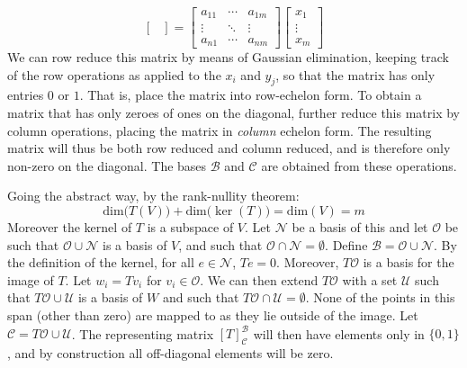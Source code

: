 \documentclass[crop=false,class=article]{standalone}                           %
\begin{document}
\begin{solution}
\begin{equation}
\begin{bmatrix}
                \end{bmatrix}=
                \begin{bmatrix}
                    a_{11}&\cdots&a_{1m}\\
                    \vdots&\ddots&\vdots\\
                    a_{n1}&\cdots&a_{nm}
                \end{bmatrix}
                \begin{bmatrix}
                    x_{1}\\
                    \vdots\\
                    x_{m}
                \end{bmatrix}
            \end{equation}
            We can row reduce this matrix by means of Gaussian elimination,
            keeping track of the row operations as applied to the $x_{i}$
            and $y_{j}$, so that the matrix has only entries $0$ or $1$.
            That is, place the matrix into row-echelon form. To obtain a
            matrix that has only zeroes of ones on the diagonal, further
            reduce this matrix by column operations, placing the matrix
            in \textit{column} echelon form. The resulting matrix will thus
            be both row reduced and column reduced, and is therefore only
            non-zero on the diagonal. The bases $\mathscr{B}$ and
            $\mathscr{C}$ are obtained from these operations.
            \par\hfill\par
            Going the abstract way, by the rank-nullity theorem:
            \begin{equation}
                \textrm{dim}\big(T(V)\big)+
                \textrm{dim}\big(\ker(T)\big)=
                \textrm{dim}(V)=m
            \end{equation}
            Moreover the kernel of $T$ is a subspace of $V$. Let
            $\mathcal{N}$ be a basis of this and let $\mathcal{O}$ be such
            that $\mathcal{O}\cup\mathcal{N}$ is a basis of $V$, and such
            that $\mathcal{O}\cap\mathcal{N}=\emptyset$.
            Define $\mathscr{B}=\mathcal{O}\cup\mathcal{N}$. By the
            definition of the kernel, for all $e\in\mathcal{N}$, $Te=0$.
            Moreover, $T\mathcal{O}$ is a basis for the image of $T$.
            Let $w_{i}=Tv_{i}$ for $v_{i}\in\mathcal{O}$. We can then
            extend $T\mathcal{O}$ with a set $\mathcal{U}$ such that
            $T\mathcal{O}\cup\mathcal{U}$ is a basis of $W$ and such that
            $T\mathcal{O}\cap\mathcal{U}=\emptyset$. None of the
            points in this span (other than zero) are mapped to as they lie
            outside of the image. Let
            $\mathscr{C}=T\mathcal{O}\cup\mathcal{U}$.
            The representing matrix $[T]_{\mathscr{C}}^{\mathscr{B}}$ will
            then have elements only in $\{0,1\}$, and by construction all
            off-diagonal elements will be zero.
        \end{solution}
\end{document}
